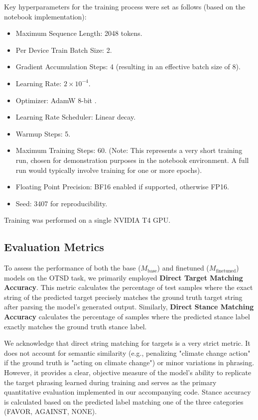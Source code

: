 \documentclass[twocolumn, 11pt,letterpaper]{article}
\begin{document}
Key hyperparameters for the training process were set as follows (based on the notebook implementation):
\begin{itemize}
    \item Maximum Sequence Length: 2048 tokens.
    \item Per Device Train Batch Size: 2.
    \item Gradient Accumulation Steps: 4 (resulting in an effective batch size of 8).
    \item Learning Rate: $2 \times 10^{-4}$.
    \item Optimizer: AdamW 8-bit \cite{adamw8bit}.
    \item Learning Rate Scheduler: Linear decay.
    \item Warmup Steps: 5.
    \item Maximum Training Steps: 60. (Note: This represents a very short training run, chosen for demonstration purposes in the notebook environment. A full run would typically involve training for one or more epochs).
    \item Floating Point Precision: BF16 enabled if supported, otherwise FP16.
    \item Seed: 3407 for reproducibility.
\end{itemize}
Training was performed on a single NVIDIA T4 GPU.

\subsection{Evaluation Metrics}
\label{sec:evaluation}

To assess the performance of both the base ($M_{\text{base}}$) and finetuned ($M_{\text{finetuned}}$) models on the OTSD task, we primarily employed \textbf{Direct Target Matching Accuracy}. This metric calculates the percentage of test samples where the exact string of the predicted target precisely matches the ground truth target string after parsing the model's generated output. Similarly, \textbf{Direct Stance Matching Accuracy} calculates the percentage of samples where the predicted stance label exactly matches the ground truth stance label.

We acknowledge that direct string matching for targets is a very strict metric. It does not account for semantic similarity (e.g., penalizing "climate change action" if the ground truth is "acting on climate change") or minor variations in phrasing. However, it provides a clear, objective measure of the model's ability to replicate the target phrasing learned during training and serves as the primary quantitative evaluation implemented in our accompanying code. Stance accuracy is calculated based on the predicted label matching one of the three categories (FAVOR, AGAINST, NONE).
\end{document}
